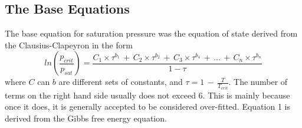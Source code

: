 \documentclass{article}
\begin{document}
\begin{singlespacing}
\section*{The Base Equations}
The base equation for saturation pressure was the equation of state derived from the Clausius-Clapeyron in the form
\begin{equation}
 ln(\frac{p_{crit}}{p_{sat}}) = \frac{C_{1} \times \tau^{b_1} \,+\, C_{2}\times \tau^{b_2} \, + \, C_{3}\times \tau^{b_4} \, + \, ... \, + \, C_{n} \times \tau^{b_n}}{1-\tau}
 \end{equation}
where $C$ can $b$ are different sets of constants, and $\tau = 1\, - \, \frac{T}{T_{crit}}$. The number of terms on the right hand side usually does not exceed 6. This is mainly because once it does, it is generally accepted to be considered over-fitted. Equation 1 is derived from the Gibbs free energy equation.

\end{singlespacing}
\end{document}
